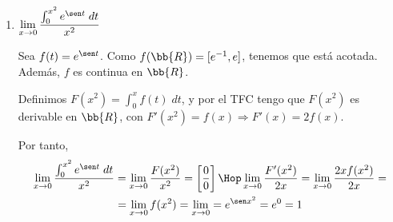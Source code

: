 \begin{ejercicio}
\begin{enumerate}
\begin{itemize}
        \end{itemize}


        \item $\displaystyle \lim_{x\to 0}\frac{\int_0^{x^2} e^{\sen t}\;dt}{x^2}$

        Sea $f(t)=e^{\sen t}$. Como $f(\bb{R})=[e^{-1},e]$, tenemos que está acotada. Además, $f$ es continua en $\bb{R}$.

            Definimos $F(x^2)=\int_0^x f(t)\;dt$, y por el TFC tengo que $F(x^2)$ es derivable en $\bb{R}$, con $F'(x^2)=f(x) \Longrightarrow F'(x)=2f(x)$.

            Por tanto,
            \begin{multline*}
                \lim_{x\to 0}\frac{\int_0^{x^2} e^{\sen t}\;dt}{x^2}
                = \lim_{x\to 0}\frac{F(x^2)}{x^2}
                = \left[\frac{0}{0}\right]
                \Hop
                \lim_{x\to 0}\frac{F'(x^2)}{2x}
                = \lim_{x\to 0}\frac{2xf(x^2)}{2x}
                =\\= \lim_{x\to 0} f(x^2)
                = \lim_{x\to 0} = e^{\sen x^2} = e^0 = 1
            \end{multline*}
    \end{enumerate}
\end{ejercicio}

